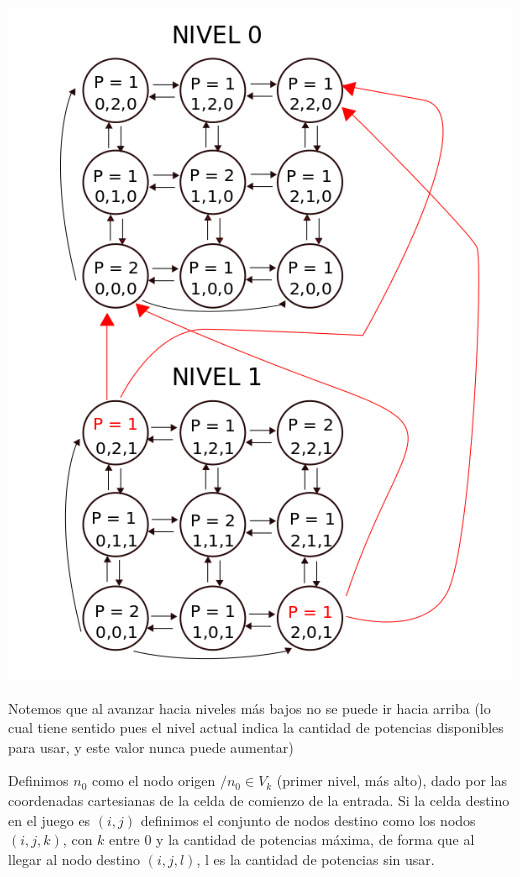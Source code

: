 \begin{center}
\includegraphics[scale=0.5]{images/dospisos}
\end{center}
\vspace{2mm}

Notemos que al avanzar hacia niveles m\'as bajos no se puede ir hacia arriba (lo cual tiene sentido pues el nivel actual indica la cantidad de potencias disponibles para usar, y este valor nunca puede aumentar)

\vspace{2mm}

Definimos $n_0$ como el nodo origen $/ n_0 \in V_k$ (primer nivel, m\'as alto), dado por las coordenadas cartesianas de la celda de comienzo de la entrada. Si la celda destino en el juego es $(i,j)$ definimos el conjunto de nodos destino como los nodos $(i,j,k)$, con $k$ entre 0 y la cantidad de potencias m\'axima, de forma que al llegar al nodo destino $(i,j,l)$, l es la cantidad de potencias sin usar.

